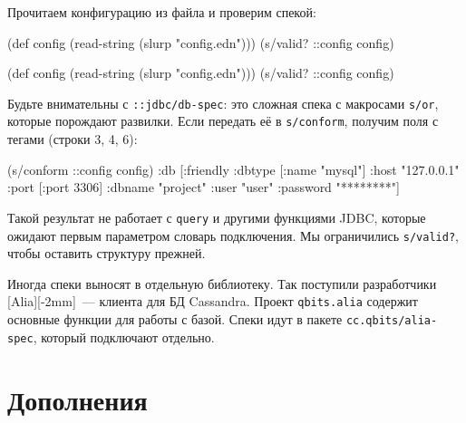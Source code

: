 \fi

\noindent
Прочитаем конфигурацию из файла и проверим спекой:

\ifx\DEVICETYPE\MOBILE

\begin{english}
  \begin{clojure}
(def config
  (read-string (slurp "config.edn")))
(s/valid? ::config config)
  \end{clojure}
\end{english}

\else

\begin{english}
  \begin{clojure}
(def config (read-string (slurp "config.edn")))
(s/valid? ::config config)
  \end{clojure}
\end{english}

\fi

\label{jdbc-conform-warning}


Будьте внимательны с \verb|::jdbc/db-spec|: это сложная спека с макросами
\verb|s/or|, которые порождают развилки. Если передать её в
\verb|s/conform|, получим поля с тегами (строки 3, 4, 6):

\begin{english}
  \begin{clojure/lines}
(s/conform ::config config)
{:db
 [:friendly
  {:dbtype   [:name "mysql"]
   :host     "127.0.0.1"
   :port     [:port 3306]
   :dbname   "project"
   :user     "user"
   :password "********"}]}
  \end{clojure/lines}
\end{english}

Такой результат не работает с \verb|query| и другими функциями JDBC, которые
ожидают первым параметром словарь подключения. Мы ограничились \verb|s/valid?|,
чтобы оставить структуру прежней.

Иногда спеки выносят в отдельную библиотеку. Так поступили разработчики
[Alia][-2mm]~--- клиента для БД
Cassandra. Проект \verb|qbits.alia| содержит основные функции для работы с
базой. Спеки идут в пакете \verb|cc.qbits/alia-spec|, который подключают
отдельно.

\section{Дополнения}

